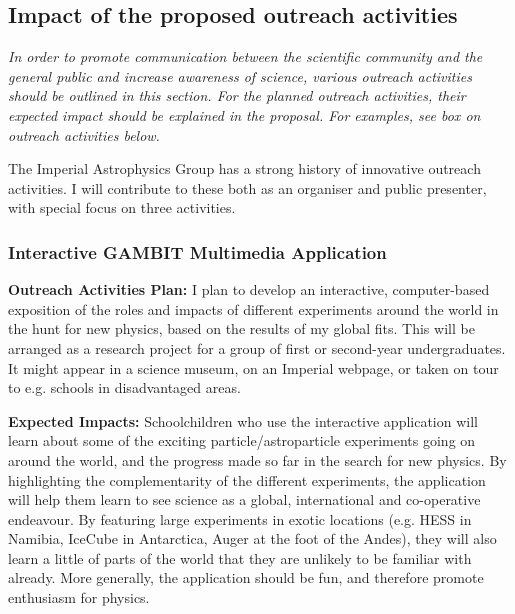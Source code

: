 \documentclass[a4paper,11pt]{article}
\newenvironment{xcomment}{\em}{}
\begin{document}
\subsection{Impact of the proposed outreach activities}
\label{outreach}

\begin{xcomment}
In order to promote communication between the scientific community and
the general public and increase awareness of science, various outreach
activities should be outlined in this section. For the planned
outreach activities, their expected impact should be explained in the
proposal. For examples, see box on outreach activities below.
\end{xcomment}

The Imperial Astrophysics Group has a strong history of innovative outreach activities. I will contribute to these both as an organiser and public presenter, with special focus on three activities.

\subsubsection{Interactive GAMBIT Multimedia Application}
 
\textbf{Outreach Activities Plan:} I plan to develop an interactive, computer-based exposition of the roles and impacts of different experiments around the world in the hunt for new physics, based on the results of my global fits.  This will be arranged as a research project for a group of first or second-year undergraduates.  It might appear in a science museum, on an Imperial webpage, or taken on tour to e.g. schools in disadvantaged areas.\vspace{3mm}

\noindent\textbf{Expected Impacts:}  Schoolchildren who use the interactive application will learn about some of the exciting particle/astroparticle experiments going on around the world, and the progress made so far in the search for new physics.  By highlighting the complementarity of the different experiments, the application will help them learn to see science as a global, international and co-operative endeavour.  By featuring large experiments in exotic locations (e.g. HESS in Namibia, IceCube in Antarctica, Auger at the foot of the Andes), they will also learn a little of parts of the world that they are unlikely to be familiar with already.  More generally, the application should be fun, and therefore promote enthusiasm for physics.
\end{document}

